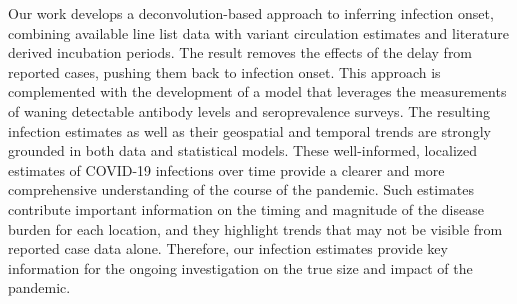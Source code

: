 Our work develops a deconvolution-based approach to inferring infection onset,
combining available line list data with variant circulation estimates and
literature derived incubation periods. The result removes the effects of the
delay from reported cases, pushing them back to infection onset. This approach
is complemented with the development of a model that leverages the
measurements of waning detectable antibody levels and seroprevalence surveys.
The resulting infection estimates as well as their geospatial and temporal
trends are strongly grounded in both data and statistical models.
%
%
%
These well-informed, localized estimates of COVID-19 infections over time
provide a clearer and more comprehensive understanding of the course of the
pandemic. Such estimates contribute important information on the timing and
magnitude of the disease burden for each location, and they highlight trends
that may not be visible from reported case data alone. Therefore, our infection
estimates provide key information for the ongoing investigation on the true size
and impact of the pandemic.
